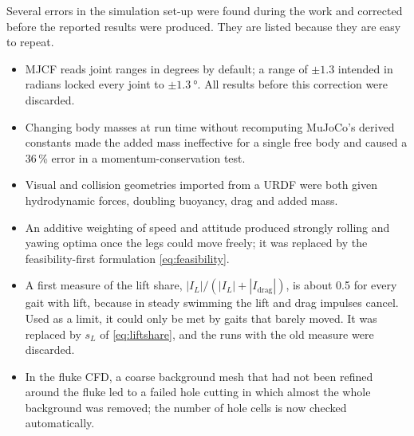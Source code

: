 Several errors in the simulation set-up were found during the work and corrected before the reported results were produced.
They are listed because they are easy to repeat.
\begin{itemize}
  \item MJCF reads joint ranges in degrees by default; a range of $\pm1.3$ intended in radians locked every joint to
        $\pm\SI{1.3}{\degree}$. All results before this correction were discarded.
  \item Changing body masses at run time without recomputing MuJoCo's derived constants made the added mass ineffective for a
        single free body and caused a 36\,\% error in a momentum-conservation test.
  \item Visual and collision geometries imported from a URDF were both given hydrodynamic forces, doubling buoyancy, drag and added
        mass.
  \item An additive weighting of speed and attitude produced strongly rolling and yawing optima once the legs could move freely;
        it was replaced by the feasibility-first formulation \eqref{eq:feasibility}.
  \item A first measure of the lift share, $|I_L|/(|I_L|+|I_\text{drag}|)$, is about 0.5 for every gait with lift, because in steady
        swimming the lift and drag impulses cancel. Used as a limit, it could only be met by gaits that barely moved. It was
        replaced by $s_L$ of \eqref{eq:liftshare}, and the runs with the old measure were discarded.
  \item In the fluke CFD, a coarse background mesh that had not been refined around the fluke led to a failed hole cutting in which
        almost the whole background was removed; the number of hole cells is now checked automatically.
\end{itemize}
